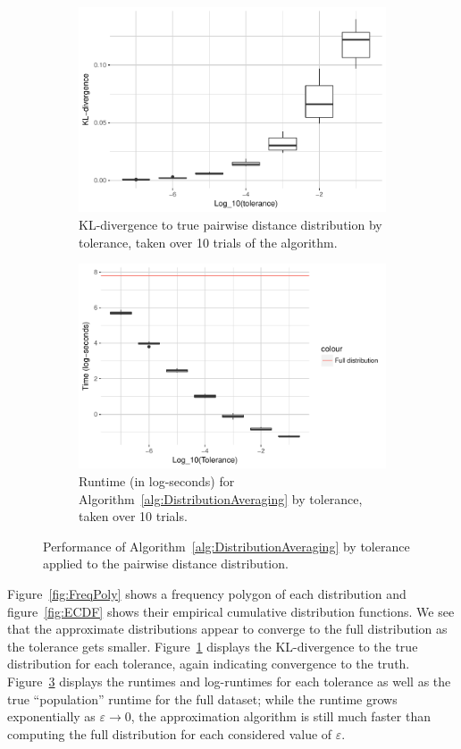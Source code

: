 \documentclass{article}
\begin{document}
\begin{figure}
\begin{subfigure}[b]{.49\textwidth}
        \includegraphics[width=\linewidth]{Figures/PairwiseDistance/div_by_tol.pdf}
    	\caption{KL-divergence to true pairwise distance distribution by tolerance, taken over 10 trials of the algorithm.}
    	\label{fig:Divergences}
	\end{subfigure}
    \begin{subfigure}[b]{.49\textwidth}
    	\includegraphics[width=0.9\linewidth]{Figures/PairwiseDistance/log_time_by_tol.pdf}
    	\caption{Runtime (in log-seconds) for Algorithm~\ref{alg:DistributionAveraging} by tolerance, taken over 10 trials.}
    	\label{fig:Times}
    \end{subfigure}
    \caption{Performance of Algorithm~\ref{alg:DistributionAveraging} by tolerance applied to the pairwise distance distribution.}
\end{figure}
Figure~\ref{fig:FreqPoly} shows a frequency polygon of each distribution and figure~\ref{fig:ECDF} shows their empirical cumulative distribution functions.
We see that the approximate distributions appear to converge to the full distribution as the tolerance gets smaller.
Figure~\ref{fig:Divergences} displays the KL-divergence to the true distribution for each tolerance, again indicating convergence to the truth.
Figure~\ref{fig:Times} displays the runtimes and log-runtimes for each tolerance as well as the true ``population'' runtime for the full dataset; while the runtime grows exponentially as $\varepsilon \to 0$, the approximation algorithm is still much faster than computing the full distribution for each considered value of $\varepsilon$.
\end{document}
